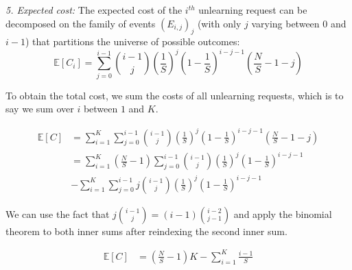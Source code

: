 \noindent\emph{5. Expected cost:} The expected cost of the $i^{th}$ unlearning request can be decomposed on the family of events $(E_{i,j})_j$ (with only $j$ varying between $0$ and $i-1$) that partitions the universe of possible outcomes:
\begin{equation}\mathbb{E}[C_i] =\sum_{j=0}^{i-1}{{i-1 \choose j}\left(\frac{1}{S}\right)^j\left(1-\frac{1}{S}\right)^{i-j-1} \left(\frac{N}{S} - 1 - j\right)}\end{equation}

To obtain the total cost, we sum the costs of all unlearning requests, which is to say we sum over $i$ between $1$ and $K$.

{\small
\begin{equation}\begin{aligned}
\mathbb{E}[C] &=\sum_{i=1}^{K}\sum_{j=0}^{i-1}{{i-1 \choose j}\left(\frac{1}{S}\right)^j\left(1-\frac{1}{S}\right)^{i-j-1} \left(\frac{N}{S} - 1 - j\right)}\\
&=\sum_{i=1}^{K}{\left(\frac{N}{S} - 1\right)\sum_{j=0}^{i-1}{{i-1 \choose j}\left(\frac{1}{S}\right)^j\left(1-\frac{1}{S}\right)^{i-j-1}}}\\
&-\sum_{i=1}^{K}\sum_{j=0}^{i-1}{j{i-1 \choose j}\left(\frac{1}{S}\right)^j\left(1-\frac{1}{S}\right)^{i-j-1}}
\end{aligned}\end{equation}
}

We can use the fact that $j{i-1 \choose j} = (i-1){i-2 \choose j-1}$ and apply the binomial theorem to both inner sums after reindexing the second inner sum.

{\small
\begin{equation}\begin{aligned}
\mathbb{E}[C] &= \left(\frac{N}{S} - 1\right)K - \sum_{i=1}^{K}{\frac{i-1}{S}}\\
\end{aligned}\end{equation}
}

